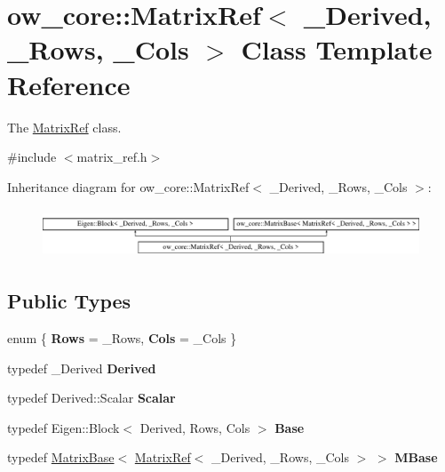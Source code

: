 \hypertarget{classow__core_1_1MatrixRef}{}\section{ow\+\_\+core\+:\+:Matrix\+Ref$<$ \+\_\+\+Derived, \+\_\+\+Rows, \+\_\+\+Cols $>$ Class Template Reference}
\label{classow__core_1_1MatrixRef}


The \hyperlink{classow__core_1_1MatrixRef}{Matrix\+Ref} class.  




{\ttfamily \#include $<$matrix\+\_\+ref.\+h$>$}

Inheritance diagram for ow\+\_\+core\+:\+:Matrix\+Ref$<$ \+\_\+\+Derived, \+\_\+\+Rows, \+\_\+\+Cols $>$\+:\begin{figure}[H]
\begin{center}
\leavevmode
\includegraphics[height=1.477572cm]{df/dd7/classow__core_1_1MatrixRef}
\end{center}
\end{figure}
\subsection*{Public Types}
\begin{DoxyCompactItemize}
\item 
enum \{ {\bfseries Rows} = \+\_\+\+Rows, 
{\bfseries Cols} = \+\_\+\+Cols
 \}\hypertarget{classow__core_1_1MatrixRef_af32b7bd8496f76570b9af5051e241c15}{}\label{classow__core_1_1MatrixRef_af32b7bd8496f76570b9af5051e241c15}

\item 
typedef \+\_\+\+Derived {\bfseries Derived}\hypertarget{classow__core_1_1MatrixRef_ad0e55e853d08951e064718a8ac69ac96}{}\label{classow__core_1_1MatrixRef_ad0e55e853d08951e064718a8ac69ac96}

\item 
typedef Derived\+::\+Scalar {\bfseries Scalar}\hypertarget{classow__core_1_1MatrixRef_a88aece9e8f552ba783c7fbc038abe8e8}{}\label{classow__core_1_1MatrixRef_a88aece9e8f552ba783c7fbc038abe8e8}

\item 
typedef Eigen\+::\+Block$<$ Derived, Rows, Cols $>$ {\bfseries Base}\hypertarget{classow__core_1_1MatrixRef_a2b935d9a0c707f1d2f709829413a75a4}{}\label{classow__core_1_1MatrixRef_a2b935d9a0c707f1d2f709829413a75a4}

\item 
typedef \hyperlink{classow__core_1_1MatrixBase}{Matrix\+Base}$<$ \hyperlink{classow__core_1_1MatrixRef}{Matrix\+Ref}$<$ \+\_\+\+Derived, \+\_\+\+Rows, \+\_\+\+Cols $>$ $>$ {\bfseries M\+Base}\hypertarget{classow__core_1_1MatrixRef_a7c5f75dd9338974df3f72e97c835f0c4}{}\label{classow__core_1_1MatrixRef_a7c5f75dd9338974df3f72e97c835f0c4}

\end{DoxyCompactItemize}

